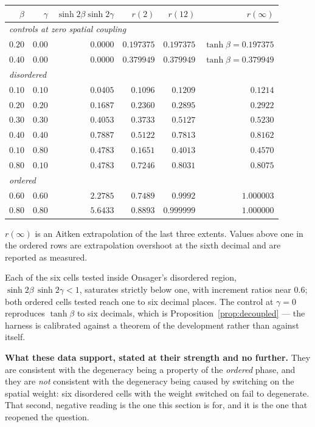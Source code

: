 \documentclass[11pt]{article}
\theoremstyle{definition}
\begin{document}
\begin{center}
\begin{tabular}{rrrrrr}
\toprule
$\beta$ & $\gamma$ & $\sinh2\beta\sinh2\gamma$ & $r(2)$ & $r(12)$ & $r(\infty)$ \\
\midrule
\multicolumn{6}{l}{\emph{controls at zero spatial coupling}}\\
$0.20$ & $0.00$ & $0.0000$ & $0.197375$ & $0.197375$ & $\tanh\beta=0.197375$\\
$0.40$ & $0.00$ & $0.0000$ & $0.379949$ & $0.379949$ & $\tanh\beta=0.379949$\\
\midrule
\multicolumn{6}{l}{\emph{disordered}}\\
$0.10$ & $0.10$ & $0.0405$ & $0.1096$ & $0.1209$ & $0.1214$\\
$0.20$ & $0.20$ & $0.1687$ & $0.2360$ & $0.2895$ & $0.2922$\\
$0.30$ & $0.30$ & $0.4053$ & $0.3733$ & $0.5127$ & $0.5230$\\
$0.40$ & $0.40$ & $0.7887$ & $0.5122$ & $0.7813$ & $0.8162$\\
$0.10$ & $0.80$ & $0.4783$ & $0.1651$ & $0.4013$ & $0.4570$\\
$0.80$ & $0.10$ & $0.4783$ & $0.7246$ & $0.8031$ & $0.8075$\\
\midrule
\multicolumn{6}{l}{\emph{ordered}}\\
$0.60$ & $0.60$ & $2.2785$ & $0.7489$ & $0.9992$ & $1.000003$\\
$0.80$ & $0.80$ & $5.6433$ & $0.8893$ & $0.999999$ & $1.000000$\\
\bottomrule
\end{tabular}
\end{center}

\noindent
$r(\infty)$ is an Aitken extrapolation of the last three extents.  Values above
one in the ordered rows are extrapolation overshoot at the sixth decimal and are
reported as measured.

Each of the six cells tested inside Onsager's disordered region,
$\sinh 2\beta\,\sinh 2\gamma<1$, saturates strictly below one, with increment
ratios near $0.6$; both ordered cells tested reach one to six decimal places.
The control at $\gamma=0$ reproduces $\tanh\beta$ to six decimals, which is
Proposition~\ref{prop:decoupled} --- the harness is calibrated against a theorem
of the development rather than against itself.

\textbf{What these data support, stated at their strength and no further.}
They are consistent with the degeneracy being a property of the \emph{ordered}
phase, and they are \emph{not} consistent with the degeneracy being caused by
switching on the spatial weight: six disordered cells with the weight switched
on fail to degenerate.  That second, negative reading is the one this section is
for, and it is the one that reopened the question.
\end{document}
